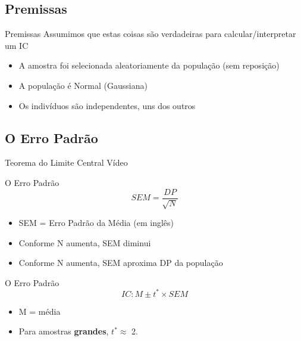 \documentclass{beamer}
\begin{document}
\subsection{Premissas}

\begin{frame}{Premissas}
  Assumimos que estas coisas são verdadeiras para calcular/interpretar um IC
  \begin{itemize}
  \item A amostra foi selecionada aleatoriamente da população (sem reposição)
  \item A população é Normal (Gaussiana)
  \item Os indivíduos são independentes, uns dos outros
  \end{itemize}
\end{frame}

\subsection{O Erro Padrão}

\begin{frame}{Teorema do Limite Central}
  Vídeo
\end{frame}

\begin{frame}{O Erro Padrão}
  \begin{displaymath}
    SEM = \frac{DP}{\sqrt{N}}
  \end{displaymath}
  \begin{itemize}
  \item SEM = Erro Padrão da Média (em inglês)
  \item Conforme N aumenta, SEM diminui
  \item Conforme N aumenta, SEM aproxima DP da população
  \end{itemize}
\end{frame}

\begin{frame}{O Erro Padrão}
  \begin{displaymath}
    IC: M \pm t^{*} \times SEM
  \end{displaymath}
  \begin{itemize}
  \item M = média
  \item Para amostras {\bf grandes}, $t^{*} \approx$ 2.
  \end{itemize}
\end{frame}
\end{document}
